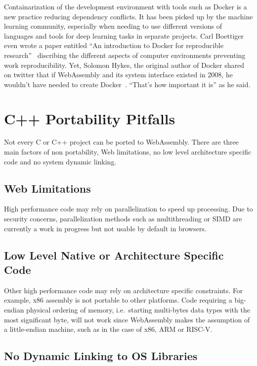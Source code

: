Containarization of the development environment with tools such as Docker
is a new practice reducing dependency conflicts.
It has been picked up by the machine learning community,
especially when needing to use different versions of languages and tools
for deep learning tasks in separate projects.
Carl Boettiger even wrote a paper entitled
``An introduction to Docker for reproducible research''~\cite{boettiger2015introduction}
discribing the different aspects of computer environments preventing work reproducibility.
Yet, Solomon Hykes, the original author of Docker shared on twitter that
if WebAssembly and its system interface existed in 2008, he wouldn't have
needed to create Docker~\cite{hykes2019twitter}. ``That's how important it is'' as he said.

\section{C++ Portability Pitfalls}%
\label{sec:cpp_pitfalls}

Not every C or C++ project can be ported to WebAssembly.
There are three main factors of non portability,
Web limitations, no low level architecture specific code and no system dynamic linking.

\subsection{Web Limitations}%
\label{sub:web_limitations}

High performance code may rely on parallelization to speed up processing.
Due to security concerns, parallelization methods such as multithreading
or SIMD are currently a work in progress but not usable by default in browsers.

\subsection{Low Level Native or Architecture Specific Code}%
\label{sub:low_level_code}

Other high performance code may rely on architecture specific constraints.
For example, x86 assembly is not portable to other platforms.
Code requiring a big-endian physical ordering of memory,
i.e.\ starting multi-bytes data types with the most significant byte,
will not work since WebAssembly makes the assumption of a little-endian machine,
such as in the case of x86, ARM or RISC-V.

\subsection{No Dynamic Linking to OS Libraries}%
\label{sub:no_dynamic_linking}

